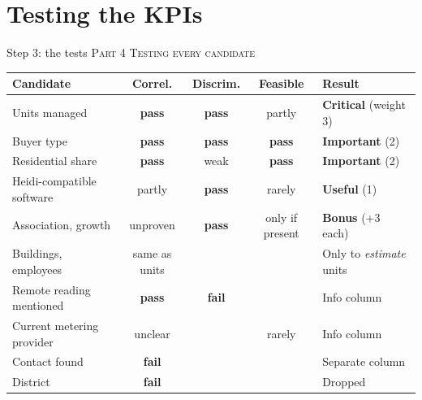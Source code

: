 \documentclass[aspectratio=169,11pt]{beamer}
\newcommand{\yes}{\textcolor{accent}{\textbf{pass}}}
\newcommand{\no}{\textcolor{bad}{\textbf{fail}}}
\newcommand{\partlabel}[1]{{\small\color{assume}\textsc{#1}}\par\vspace{0.3em}}
\begin{document}
\section{Testing the KPIs}

\begin{frame}{Step 3: the tests}
  \partlabel{Part 4 \textbullet{} Testing every candidate}
  \footnotesize
  \begin{tabular}{@{}p{3.4cm} c c c p{4.8cm}@{}}
    \toprule
    \textbf{Candidate} & \textbf{Correl.} & \textbf{Discrim.} & \textbf{Feasible} & \textbf{Result} \\
    \midrule
    Units managed & \yes & \yes & partly & \textbf{Critical} (weight 3) \\
    Buyer type & \yes & \yes & \yes & \textbf{Important} (2) \\
    Residential share & \yes & weak & \yes & \textbf{Important} (2) \\
    Heidi-compatible software & partly & \yes & rarely & \textbf{Useful} (1) \\
    Association, growth & unproven & \yes & only if present & \textbf{Bonus} (+3 each) \\
    Buildings, employees & same as units & & & Only to \emph{estimate} units \\
    Remote reading mentioned & \yes & \no & & Info column \\
    Current metering provider & unclear & & rarely & Info column \\
    Contact found & \no & & & Separate column \\
    District & \no & & & Dropped \\
    \bottomrule
  \end{tabular}
\end{frame}
\end{document}
